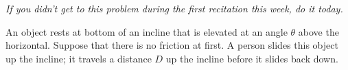 \documentclass[12pt]{article}
\begin{document}
\Large
\centerline{}
\normalsize
\centerline{}
%
%
%
%
%

\begin{center}
	\small \it If you didn't get to this problem during the first recitation this week, do it today.
\end{center}

 An object rests at bottom of an incline that is elevated at an angle $\theta$ above the horizontal. Suppose that there is no friction at first. A person slides this object up the incline; it travels a distance $D$ up the incline before it slides back down.
\end{document}
